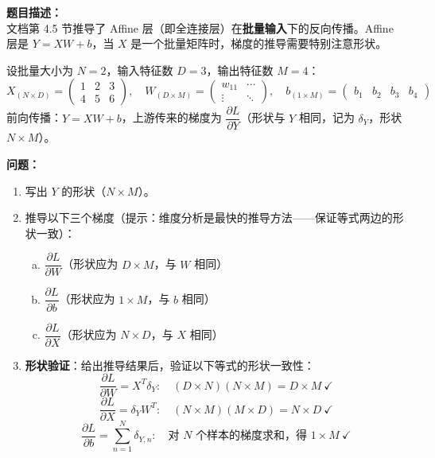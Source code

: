 \documentclass[a4paper,11pt]{ctexart}
\begin{document}
\begin{problembox}
    \textbf{题目描述：}\\
    文档第 4.5 节推导了 Affine 层（即全连接层）在\textbf{批量输入}下的反向传播。Affine 层是 $Y = XW + b$，当 $X$ 是一个批量矩阵时，梯度的推导需要特别注意形状。

    \vspace{0.3cm}
    设批量大小为 $N=2$，输入特征数 $D=3$，输出特征数 $M=4$：
    \[
    X_{(N \times D)} = \begin{pmatrix} 1 & 2 & 3 \\ 4 & 5 & 6 \end{pmatrix}, \quad
    W_{(D \times M)} = \begin{pmatrix} w_{11} & \cdots \\ \vdots & \ddots \end{pmatrix}, \quad
    b_{(1 \times M)} = \begin{pmatrix} b_1 & b_2 & b_3 & b_4 \end{pmatrix}
    \]
    前向传播：$Y = XW + b$，上游传来的梯度为 $\dfrac{\partial L}{\partial Y}$（形状与 $Y$ 相同，记为 $\delta_Y$，形状 $N \times M$）。

    \vspace{0.3cm}
    \textbf{问题：}
    \begin{enumerate}[(1)]
        \item 写出 $Y$ 的形状（$N \times M$）。

        \item 推导以下三个梯度（提示：维度分析是最快的推导方法——保证等式两边的形状一致）：
        \begin{enumerate}[a.]
            \item $\dfrac{\partial L}{\partial W}$（形状应为 $D \times M$，与 $W$ 相同）
            \item $\dfrac{\partial L}{\partial b}$（形状应为 $1 \times M$，与 $b$ 相同）
            \item $\dfrac{\partial L}{\partial X}$（形状应为 $N \times D$，与 $X$ 相同）
        \end{enumerate}

        \item \textbf{形状验证}：给出推导结果后，验证以下等式的形状一致性：
        \[
        \frac{\partial L}{\partial W} = X^T \delta_Y: \quad (D \times N)(N \times M) = D \times M\ \checkmark
        \]
        \[
        \frac{\partial L}{\partial X} = \delta_Y W^T: \quad (N \times M)(M \times D) = N \times D\ \checkmark
        \]
        \[
        \frac{\partial L}{\partial b} = \sum_{n=1}^{N}\delta_{Y,n}: \quad \text{对 }N\text{ 个样本的梯度求和，得 }1 \times M\ \checkmark
        \]


\end{enumerate}
\end{problembox}
\end{document}

